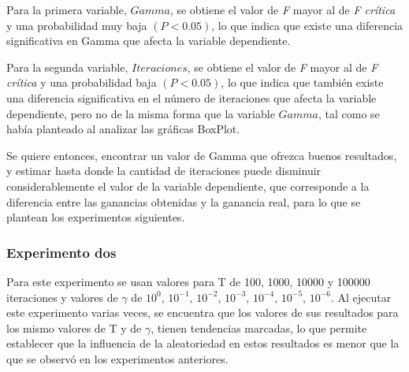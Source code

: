Para la primera variable, $Gamma$, se obtiene el valor de \textit{F} mayor al de \textit{F crítica} y una probabilidad muy baja $(P<0.05)$, lo que indica que existe una diferencia significativa en Gamma que afecta la variable dependiente.

Para la segunda variable, $Iteraciones$, se obtiene el valor de \textit{F} mayor al de \textit{F crítica} y una probabilidad baja $(P<0.05)$, lo que indica que también existe una diferencia significativa en el número de iteraciones que afecta la variable dependiente, pero no de la misma forma que la variable $Gamma$, tal como se había planteado al analizar las gráficas BoxPlot.

Se quiere entonces, encontrar un valor de Gamma que ofrezca buenos resultados, y estimar hasta donde la cantidad de iteraciones puede disminuir considerablemente el valor de la variable dependiente, que corresponde a la diferencia entre las ganancias obtenidas y la ganancia real, para lo que se plantean los experimentos siguientes.

\subsubsection{Experimento dos}


Para este experimento se usan valores para T de 100, 1000, 10000 y 100000 iteraciones y valores de $\gamma$ de $10^{0}$, $10^{-1}$, $10^{-2}$, $10^{-3}$, $10^{-4}$, $10^{-5}$, $10^{-6}$. Al ejecutar este experimento varias veces, se encuentra que los valores de sus resultados para los mismo valores de T y de $\gamma$, tienen tendencias marcadas, lo que permite establecer que la influencia de la aleatoriedad en estos resultados es menor que la que se observó en los experimentos anteriores. 

